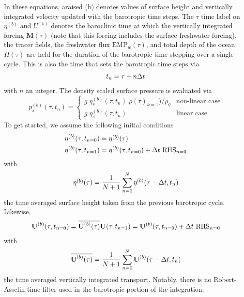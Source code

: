 {In these equations, araised (b) denotes values of surface height and vertically integrated velocity updated with the barotropic time steps. The $\tau$ time label on $\eta^{(b)}$ 
and $U^{(b)}$ denotes the baroclinic time at which the vertically integrated forcing $\textbf{M}(\tau)$ (note that this forcing includes the surface freshwater forcing), the tracer fields, the freshwater flux $\text{EMP}_w(\tau)$, and total depth of the ocean $H(\tau)$ are held for the duration of the barotropic time stepping over a single cycle. This is also the time 
that sets the barotropic time steps via 
\begin{equation} \label{DYN_spg_ts_t}
t_n=\tau+n\Delta t   
\end{equation}
with $n$ an integer. The density scaled surface pressure is evaluated via 
\begin{equation} \label{DYN_spg_ts_ps}
p_s^{(b)}(\tau,t_{n}) = \begin{cases}
	g \;\eta_s^{(b)}(\tau,t_{n}) \;\rho(\tau)_{k=1}) / \rho_o  &      \text{non-linear case} \\
	g \;\eta_s^{(b)}(\tau,t_{n})  &      \text{linear case} 
	\end{cases}
\end{equation}
To get started, we assume the following initial conditions 
\begin{equation} \label{DYN_spg_ts_eta}
\begin{split}
\eta^{(b)}(\tau,t_{n=0}) &= \overline{\eta^{(b)}(\tau)}
\\
\eta^{(b)}(\tau,t_{n=1}) &= \eta^{(b)}(\tau,t_{n=0}) + \rdt \ \text{RHS}_{n=0} 
\end{split}
\end{equation}
with 
\begin{equation} \label{DYN_spg_ts_etaF}
 \overline{\eta^{(b)}(\tau)} = \frac{1}{N+1} \sum\limits_{n=0}^N \eta^{(b)}(\tau-\Delta t,t_{n})
\end{equation}
the time averaged surface height taken from the previous barotropic cycle. Likewise, 
\begin{equation} \label{DYN_spg_ts_u}
\textbf{U}^{(b)}(\tau,t_{n=0}) = \overline{\textbf{U}^{(b)}(\tau)}	\\
\\
\textbf{U}(\tau,t_{n=1}) = \textbf{U}^{(b)}(\tau,t_{n=0}) + \rdt \ \text{RHS}_{n=0}  	
\end{equation}
with 
\begin{equation} \label{DYN_spg_ts_u}
 \overline{\textbf{U}^{(b)}(\tau)} 
 	= \frac{1}{N+1} \sum\limits_{n=0}^N\textbf{U}^{(b)}(\tau-\Delta t,t_{n})
\end{equation}
the time averaged vertically integrated transport. Notably, there is no Robert-Asselin time filter used in the barotropic portion of the integration. 

}
